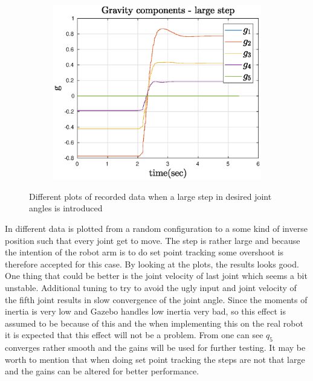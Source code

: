 \begin{figure}[htbp]
\begin{subfigure}[htbp]{0.45\textwidth}
        \caption{ }
    \end{subfigure}
    ~
    \begin{subfigure}[htbp]{0.45\textwidth}
        \centering
        \includegraphics[width = \picsSiz\linewidth]{img/LSgrav.eps}
        \caption{ }
    \end{subfigure}
    \caption{Different plots of recorded data when a large step in desired joint angles is introduced}
    \label{fig:LS}
\end{figure}

In  different data is plotted from a random configuration to a some kind of inverse position such that every joint get to move. The step is rather large and because the intention of the robot arm is to do set point tracking some overshoot is therefore accepted for this case. By looking at the plots, the results looks good. One thing that could be better is the joint velocity of last joint which seems a bit unstable. Additional tuning to try to avoid the ugly input and joint velocity of the fifth joint results in slow convergence of the joint angle. Since the moments of inertia is very low and Gazebo handles low inertia very bad, so this effect is assumed to be because of this and the when implementing this on the real robot it is expected that this effect will not be a problem. From  one can see $q_5$ converges rather smooth and the gains will be used for further testing. It may be worth to mention that when doing set point tracking the steps are not that large and the gains can be altered for better performance.  \\

